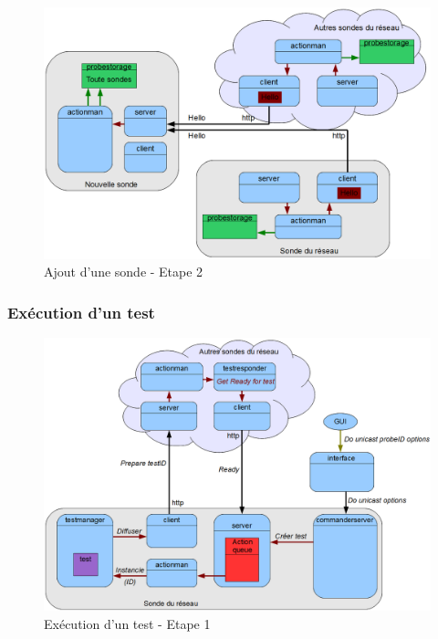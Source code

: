 \documentclass[a4paper,11pt]{article}
\begin{document}
\begin{figure}
\centering\includegraphics[width=\linewidth]{img/graphAdd2.png}
\caption{Ajout d'une sonde - Etape 2}
\end{figure}


\subsubsection{Exécution d'un test}

\begin{figure}
\centering\includegraphics[width=\linewidth]{img/graphTest1.png}
\caption{Exécution d'un test - Etape 1}
\end{figure}
\end{document}
